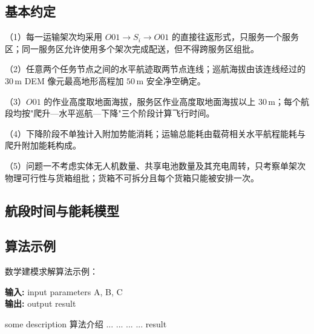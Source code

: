 \documentclass[bwprint,fontset=fandol]{gmcmthesis}
\begin{document}
\subsection{基本约定}
（1）每一运输架次均采用 $O01 \to S_i \to O01$ 的直接往返形式，只服务一个服务区；同一服务区允许使用多个架次完成配送，但不得跨服务区组批。

（2）任意两个任务节点之间的水平航迹取两节点连线；巡航海拔由该连线经过的 $30\,\mathrm{m}$ DEM 像元最高地形高程加 $50\,\mathrm{m}$ 安全净空确定。

（3）$O01$ 的作业高度取地面海拔，服务区作业高度取地面海拔以上 $30\,\mathrm{m}$；每个航段均按"爬升—水平巡航—下降"三个阶段计算飞行时间。

（4）下降阶段不单独计入附加势能消耗；运输总能耗由载荷相关水平航程能耗与爬升附加能耗构成。

（5）问题一不考虑实体无人机数量、共享电池数量及其充电周转，只考察单架次物理可行性与货箱组批；货箱不可拆分且每个货箱只能被安排一次。
\subsection{航段时间与能耗模型}

\subsection{算法示例}

数学建模求解算法示例：
\begin{center}
\begin{minipage}{0.8\textwidth}
\begin{algorithm}[H]%
\caption{算法的名字} %
{\bf 输入:} %
input parameters A, B, C\\
{\bf 输出:} %
output result
\begin{algorithmic}[1]
\State some description 算法介绍 %
  \State ...
    \State ...
  \Else
    \State ...
  \EndIf
\EndFor
{} %
  \State ...
\EndWhile
\State \Return result
\end{algorithmic}
\end{algorithm}
\end{minipage}
\end{center}
\vspace{2ex}
\end{document}
